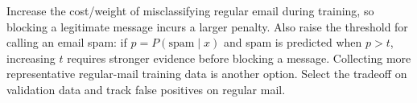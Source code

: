 Increase the cost/weight of misclassifying regular email during training, so blocking a legitimate message incurs a larger penalty. Also raise the threshold for calling an email spam: if \(p=P(\mathrm{spam}\mid x)\) and spam is predicted when \(p>t\), increasing \(t\) requires stronger evidence before blocking a message. Collecting more representative regular-mail training data is another option. Select the tradeoff on validation data and track false positives on regular mail.
